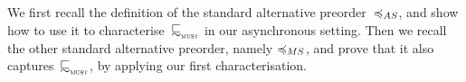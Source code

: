 We first recall the definition of the 
standard alternative preorder~$\asleq$,
and show how to use it to characterise~$\testleqS$ in our asynchronous setting.
Then we recall the other standard alternative preorder, namely $\msleq$,
and prove that it also captures~$\testleqS$, by applying our first characterisation.








